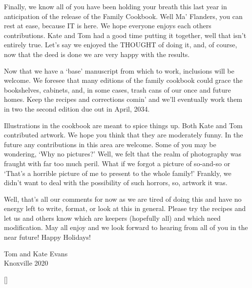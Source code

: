 \documentclass[12pt]{article}
\begin{document}
{\color{red}
Finally, we know all of you have been holding your breath this last year
in anticipation of the release of the Family Cookbook.  Well Ma'
Flanders, you can rest at ease, because IT is here.  We hope everyone
enjoys each others contributions.  Kate and Tom had a good time putting it
together, well that isn't entirely true.  Let's say we enjoyed the
THOUGHT of doing it, and, of course, now that the deed is done we are
very happy with the results.

Now that we have a `base' manuscript from which to work, inclusions will
be welcome.  We foresee that many editions of the family cookbook could
grace the bookshelves, cabinets, and, in some cases, trash cans of our
once and future homes.  Keep the recipes and corrections comin' and we'll
eventually work them in two the second edition due out in April, 2034.

Illustrations in the cookbook are meant to spice things up. Both Kate and
Tom contributed artwork.  We hope you think that they are moderately
funny.  In the future any contributions in this area are welcome.  Some
of you may be wondering, `Why no pictures?'  Well, we felt that the realm
of photography was fraught with far too much peril.  What if we forgot a
picture of so-and-so or `That's a horrible picture of me to present to
the whole family!'  Frankly, we didn't want to deal with the possibility
of such horrors, so, artwork it was.

Well, that's all our comments for now as we are tired of doing this and
have no energy left to write, format, or look at this in general.  Please
try the recipes and let us and others know which are keepers (hopefully
all) and which need modification.  May all enjoy and we look forward to
hearing from all of you  in the near future!  Happy Holidays!
}

\vspace{.5in}
\begin{flushright}
Tom and Kate Evans\\ Knoxville 2020
\end{flushright}


\titleformat{\section}{\Huge\bfseries\uppercase}{\thesection}{1em}{}[\titlerule]







\end{document}
